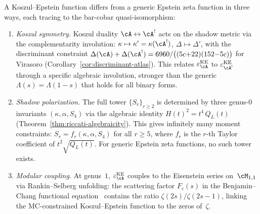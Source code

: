 \begin{remark}%
\label{rem:koszul-epstein-constraints}%
A Koszul--Epstein function differs from a generic
Epstein zeta function in three ways, each tracing to the
bar-cobar quasi-isomorphism:
\begin{enumerate}[label=\textup{(\roman*)}]
\item
\emph{Koszul symmetry.}
Koszul duality $\cA \leftrightarrow \cA^!$ acts on the shadow
metric via the complementarity involution:
$\kappa \mapsto \kappa' = \kappa(\cA^!)$,
$\Delta \mapsto \Delta'$,
with the discriminant constraint
$\Delta(\cA) + \Delta(\cA^!) = 6960/\bigl((5c{+}22)(152{-}5c)\bigr)$
for Virasoro
\textup{(}Corollary~\textup{\ref{cor:discriminant-atlas}}\textup{)}.
This relates $\varepsilon^{\mathrm{KE}}_\cA$ to
$\varepsilon^{\mathrm{KE}}_{\cA^!}$ through a specific algebraic
involution, stronger than the generic
$\Lambda(s) = \Lambda(1{-}s)$ that holds for all binary forms.

\item
\emph{Shadow polarization.}
The full tower $\{S_r\}_{r \geq 2}$ is determined by
three genus-$0$ invariants $(\kappa, \alpha, S_4)$ via the
algebraic identity $H(t)^2 = t^4\,Q_L(t)$
\textup{(}Theorem~\textup{\ref{thm:riccati-algebraicity}}\textup{)}.
This gives infinitely many moment constraints:
$S_r = f_r(\kappa, \alpha, S_4)$ for all $r \geq 5$, where
$f_r$ is the $r$-th Taylor coefficient of $t^2\sqrt{Q_L(t)}$.
For generic Epstein zeta functions, no such tower exists.

\item
\emph{Modular coupling.}
At genus~$1$, $\varepsilon^{\mathrm{KE}}_\cA$ couples to
the Eisenstein series on~$\cM_{1,1}$ via Rankin--Selberg
unfolding: the scattering factor $F_c(s)$ in the
Benjamin--Chang functional equation~\cite{BenjaminChang22}
contains the ratio $\zeta(2s)/\zeta(2s{-}1)$, linking the
MC-constrained Koszul--Epstein function to the zeros
of~$\zeta$.
\end{enumerate}
\end{remark}

